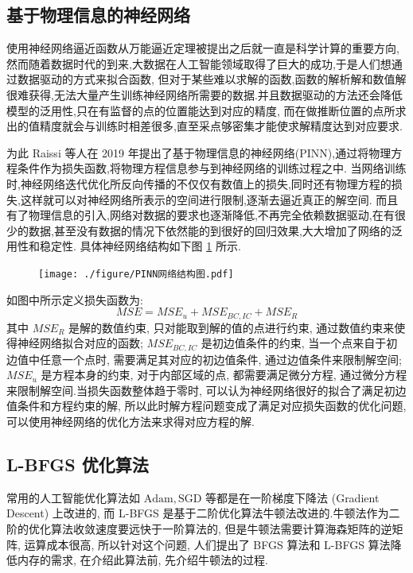 \documentclass{Sichuan Normal University}
\begin{document}
\subsection{基于物理信息的神经网络}
使用神经网络逼近函数从万能逼近定理被提出之后就一直是科学计算的重要方向,然而随着数据时代的到来,大数据在人工智能领域取得了巨大的成功,于是人们想通过数据驱动的方式来拟合函数,
但对于某些难以求解的函数,函数的解析解和数值解很难获得,无法大量产生训练神经网络所需要的数据.并且数据驱动的方法还会降低模型的泛用性,只在有监督的点的位置能达到对应的精度,
而在做推断位置的点所求出的值精度就会与训练时相差很多,直至采点够密集才能使求解精度达到对应要求.

为此 Raissi 等人在 2019 年提出了基于物理信息的神经网络(PINN)\cite{raissiPhysicsinformedNeuralNetworks2019},通过将物理方程条件作为损失函数,将物理方程信息参与到神经网络的训练过程之中.
当网络训练时,神经网络迭代优化所反向传播的不仅仅有数值上的损失,同时还有物理方程的损失,这样就可以对神经网络所表示的空间进行限制,逐渐去逼近真正的解空间.
而且有了物理信息的引入,网络对数据的要求也逐渐降低,不再完全依赖数据驱动,在有很少的数据,甚至没有数据的情况下依然能的到很好的回归效果,大大增加了网络的泛用性和稳定性.
具体神经网络结构如下图 \ref{fig:PINN Network Structure} 所示.
\begin{figure}[H]
    \centering
    \texttt{[image: ./figure/PINN网络结构图.pdf]}
    \label{fig:PINN Network Structure}
    \end{figure}
如图中所示定义损失函数为:
\begin{equation}
    M S E=M S E_u+M S E_{B C, I C}+M S E_R
    \label{eq:损失函数}  
\end{equation}其中 $M S E_R$ 是解的数值约束, 只对能取到解的值的点进行约束, 通过数值约束来使得神经网络拟合对应的函数; $M S E_{B C, I C}$ 是初边值条件的约束, 当一个点来自于初边值中任意一个点时, 需要满足其对应的初边值条件, 通过边值条件来限制解空间; 
$M S E_u$ 是方程本身的约束, 对于内部区域的点, 都需要满足微分方程, 通过微分方程来限制解空间.当损失函数整体趋于零时, 可以认为神经网络很好的拟合了满足初边值条件和方程约束的解, 所以此时解方程问题变成了满足对应损失函数的优化问题, 可以使用神经网络的优化方法来求得对应方程的解.

\subsection{L-BFGS 优化算法}
常用的人工智能优化算法如 $\mathrm{Adam}, \mathrm{SGD}$ 等都是在一阶梯度下降法 (Gradient Descent) 上改进的, 而 L-BFGS 是基于二阶优化算法牛顿法改进的.牛顿法作为二阶的优化算法收敛速度要远快于一阶算法的, 
但是牛顿法需要计算海森矩阵的逆矩阵, 运算成本很高, 所以针对这个问题, 人们提出了 BFGS 算法和 L-BFGS 算法降低内存的需求, 在介绍此算法前, 先介绍牛顿法的过程.
\end{document}
